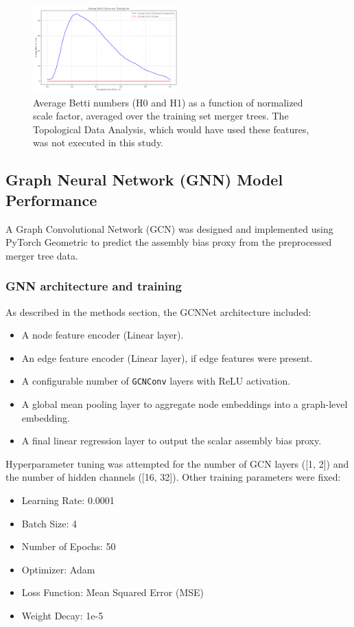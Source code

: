 \documentclass[twocolumn]{aastex631}
\begin{document}
\begin{figure}[htbp]
    \centering
    \includegraphics[width=0.5\textwidth]{../input_files/plots/avg_betti_curves_2_1748137556.png}
    \caption{\label{fig:avg_betti_numbers}Average Betti numbers (H0 and H1) as a function of normalized scale factor, averaged over the training set merger trees. The Topological Data Analysis, which would have used these features, was not executed in this study.}
\end{figure}

\subsection{Graph Neural Network (GNN) Model Performance}

A Graph Convolutional Network (GCN) was designed and implemented using PyTorch Geometric to predict the assembly bias proxy from the preprocessed merger tree data.

\subsubsection{GNN architecture and training}
As described in the methods section, the GCNNet architecture included:
\begin{itemize}
    \item A node feature encoder (Linear layer).
    \item An edge feature encoder (Linear layer), if edge features were present.
    \item A configurable number of \texttt{GCNConv} layers with ReLU activation.
    \item A global mean pooling layer to aggregate node embeddings into a graph-level embedding.
    \item A final linear regression layer to output the scalar assembly bias proxy.
\end{itemize}

Hyperparameter tuning was attempted for the number of GCN layers ([1, 2]) and the number of hidden channels ([16, 32]). Other training parameters were fixed:
\begin{itemize}
    \item Learning Rate: 0.0001
    \item Batch Size: 4
    \item Number of Epochs: 50
    \item Optimizer: Adam
    \item Loss Function: Mean Squared Error (MSE)
    \item Weight Decay: 1e-5
\end{itemize}
\end{document}
